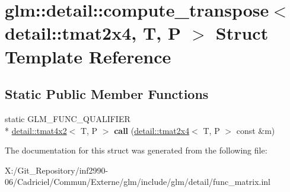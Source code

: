 \hypertarget{structglm_1_1detail_1_1compute__transpose_3_01detail_1_1tmat2x4_00_01_t_00_01_p_01_4}{\section{glm\-:\-:detail\-:\-:compute\-\_\-transpose$<$ detail\-:\-:tmat2x4, T, P $>$ Struct Template Reference}
\label{structglm_1_1detail_1_1compute__transpose_3_01detail_1_1tmat2x4_00_01_t_00_01_p_01_4}
}
\subsection*{Static Public Member Functions}
\begin{DoxyCompactItemize}
\item 
\hypertarget{structglm_1_1detail_1_1compute__transpose_3_01detail_1_1tmat2x4_00_01_t_00_01_p_01_4_a773fe20856af1171dcc8d60246eea5d2}{static G\-L\-M\-\_\-\-F\-U\-N\-C\-\_\-\-Q\-U\-A\-L\-I\-F\-I\-E\-R \\*
\hyperlink{structglm_1_1detail_1_1tmat4x2}{detail\-::tmat4x2}$<$ T, P $>$ {\bfseries call} (\hyperlink{structglm_1_1detail_1_1tmat2x4}{detail\-::tmat2x4}$<$ T, P $>$ const \&m)}\label{structglm_1_1detail_1_1compute__transpose_3_01detail_1_1tmat2x4_00_01_t_00_01_p_01_4_a773fe20856af1171dcc8d60246eea5d2}

\end{DoxyCompactItemize}


The documentation for this struct was generated from the following file\-:\begin{DoxyCompactItemize}
\item 
X\-:/\-Git\-\_\-\-Repository/inf2990-\/06/\-Cadriciel/\-Commun/\-Externe/glm/include/glm/detail/func\-\_\-matrix.\-inl\end{DoxyCompactItemize}
